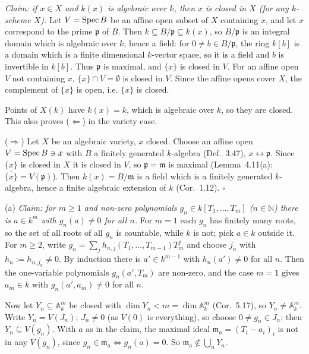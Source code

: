 \documentclass[11pt]{article}
\begin{document}
\emph{Claim: if $x\in X$ and $k(x)$ is algebraic over $k$, then $x$ is closed in $X$ (for any $k$-scheme $X$).} Let $V=\operatorname{Spec} B$ be an affine open subset of $X$ containing $x$, and let $x$ correspond to the prime $\mathfrak p$ of $B$. Then $k\subseteq B/\mathfrak p\subseteq k(x)$, so $B/\mathfrak p$ is an integral domain which is algebraic over $k$, hence a field: for $0\ne b\in B/\mathfrak p$, the ring $k[b]$ is a domain which is a finite dimensional $k$-vector space, so it is a field and $b$ is invertible in $k[b]$. Thus $\mathfrak p$ is maximal, and $\{x\}$ is closed in $V$. For an affine open $V$ not containing $x$, $\{x\}\cap V=\emptyset$ is closed in $V$. Since the affine opens cover $X$, the complement of $\{x\}$ is open, i.e. $\{x\}$ is closed.

Points of $X(k)$ have $k(x)=k$, which is algebraic over $k$, so they are closed. This also proves ($\Leftarrow$) in the variety case.

($\Rightarrow$) Let $X$ be an algebraic variety, $x$ closed. Choose an affine open $V=\operatorname{Spec} B\ni x$ with $B$ a finitely generated $k$-algebra (Def.~3.47), $x\leftrightarrow\mathfrak p$. Since $\{x\}$ is closed in $X$ it is closed in $V$, so $\mathfrak p=\mathfrak m$ is maximal (Lemma~4.11(a): $\overline{\{x\}}=V(\mathfrak p)$). Then $k(x)=B/\mathfrak m$ is a field which is a finitely generated $k$-algebra, hence a finite algebraic extension of $k$ (Cor.~1.12). \hfill$\square$

\pf
(a) \emph{Claim: for $m\ge1$ and non-zero polynomials $g_n\in k[T_1,\dots,T_m]$ ($n\in\mathbb N$) there is $a\in k^m$ with $g_n(a)\ne0$ for all $n$.} For $m=1$ each $g_n$ has finitely many roots, so the set of all roots of all $g_n$ is countable, while $k$ is not; pick $a\in k$ outside it. For $m\ge2$, write $g_n=\sum_jh_{n,j}(T_1,\dots,T_{m-1})T_m^j$ and choose $j_n$ with $h_n:=h_{n,j_n}\ne0$. By induction there is $a'\in k^{m-1}$ with $h_n(a')\ne0$ for all $n$. Then the one-variable polynomials $g_n(a',T_m)$ are non-zero, and the case $m=1$ gives $a_m\in k$ with $g_n(a',a_m)\ne0$ for all $n$.

Now let $Y_n\subseteq\mathbb A^m_k$ be closed with $\dim Y_n<m=\dim\mathbb A^m_k$ (Cor.~5.17), so $Y_n\ne\mathbb A^m_k$. Write $Y_n=V(J_n)$; $J_n\ne0$ (as $V(0)$ is everything), so choose $0\ne g_n\in J_n$; then $Y_n\subseteq V(g_n)$. With $a$ as in the claim, the maximal ideal $\mathfrak m_a=(T_i-a_i)_i$ is not in any $V(g_n)$, since $g_n\in\mathfrak m_a\iff g_n(a)=0$. So $\mathfrak m_a\notin\bigcup_nY_n$.
\end{document}
